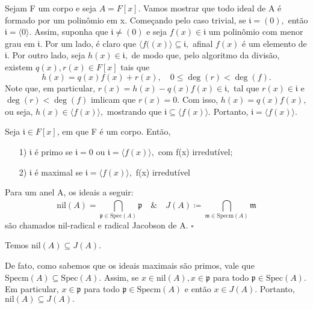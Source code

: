 \documentclass[algebraII_notes.tex]{subfiles}
\begin{document}
\begin{example}
	Sejam F um corpo e seja \(A = F[x]\). Vamos mostrar que todo ideal de A é formado por um polinômio em x.
	Começando pelo caso trivial, se \(\mathfrak{i} = (0),\) então \(\mathfrak{i} = \langle 0 \rangle.\) Assim, suponha que \(\mathfrak{i}\neq (0)\)
	e seja \(f(x)\in \mathfrak{i}\) um polinômio com menor grau em \(\mathfrak{i}.\) Por um lado, é claro que \(\langle f((x) \rangle\subseteq \mathfrak{i},\)
	afinal \(f(x)\) é um elemento de \(\mathfrak{i}.\) Por outro lado, seja \(h(x)\in \mathfrak{i},\) de modo que, pelo algoritmo da divisão, existem \(q(x), r(x)\in F[x]\) tais que
	\[
		h(x) = q(x)f(x) + r(x),\quad 0\leq \deg{(r)}<\deg{(f)}.
	\]
	Note que, em particular, \(r(x) = h(x)-q(x)f(x)\in \mathfrak{i},\) tal que \(r(x)\in \mathfrak{i}\) e \(\deg{(r)} <\deg{(f)}\)
	imlicam que \(r(x) = 0\). Com isso, \(h(x) = q(x)f(x),\) ou seja, \(h(x)\in \langle f(x) \rangle,\) mostrando que \(\mathfrak{i}\subseteq \langle f(x) \rangle.\)
	Portanto, \(\mathfrak{i} = \langle f(x) \rangle.\)
\end{example}
\begin{lemma*}[Exercício]
	Seja \(\mathfrak{i}\in F[x]\), em que F é um corpo. Então,
	\begin{itemize}
		\item[1)] \(\mathfrak{i}\) é primo se \(\mathfrak{i} = 0\) ou \(\mathfrak{i} = \langle f(x) \rangle,\) com f(x) irredutível;
		\item[2)] \(\mathfrak{i}\) é maximal se \(\mathfrak{i} = \langle f(x) \rangle,\) f(x) irredutível
	\end{itemize}
\end{lemma*}
\begin{def*}
	Para um anel A, os ideais a seguir:
	\[
		\mathrm{nil}(A) = \bigcap_{\mathfrak{p}\in \mathrm{Spec}(A)}^{}{\mathfrak{p}}\quad \& \quad J(A)\coloneqq \bigcap_{\mathfrak{m}\in \mathrm{Specm}(A)}^{}{\mathfrak{m}}
	\]
	são chamados nil-radical e radical Jacobson de A. \(\square\)
\end{def*}
\begin{prop*}
	Temos \(\mathrm{nil}(A) \subseteq{J(A)}.\)
\end{prop*}
\begin{proof*}
	De fato, como sabemos que os ideais maximais são primos, vale que \(\mathrm{Specm}(A)\subseteq{\mathrm{Spec}(A)}.\) Assim, se
	\(x\in \mathrm{nil}(A),x\in \mathfrak{p}\) para todo \(\mathfrak{p}\in \mathrm{Spec}(A).\) Em particular, \(x\in \mathfrak{p}\) para todo \(\mathfrak{p}\in \mathrm{Specm}(A)\)
	e então \(x\in J(A)\). Portanto, \(\mathrm{nil}(A) \subseteq{J(A)}.\) \qedsymbol
\end{proof*}
\end{document}
